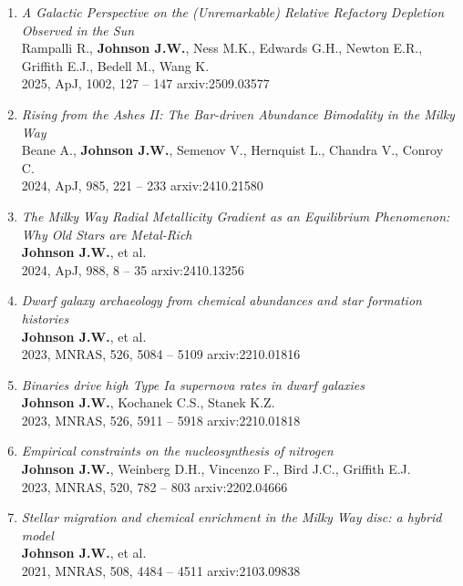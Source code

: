 \documentclass[cv.tex]{subfiles}
\begin{document}
\begin{enumerate}
	\item \textit{A Galactic Perspective on the (Unremarkable) Relative
	Refactory Depletion Observed in the Sun}
	\\
	Rampalli R., \textbf{Johnson J.W.}, Ness M.K., Edwards G.H., Newton E.R.,
	Griffith E.J., Bedell M., Wang K.
	\\
	2025, ApJ, 1002, 127 -- 147 \hfill arxiv:2509.03577

	\item \textit{Rising from the Ashes II: The Bar-driven Abundance Bimodality
	in the Milky Way}
	\\
	Beane A., \textbf{Johnson J.W.}, Semenov V., Hernquist L., Chandra V.,
	Conroy C.
	\\
	2024, ApJ, 985, 221 -- 233 \hfill arxiv:2410.21580

	\item \textit{The Milky Way Radial Metallicity Gradient as an Equilibrium
	Phenomenon: Why Old Stars are Metal-Rich}
	\\
	\textbf{Johnson J.W.}, et al.
	\\
	2024, ApJ, 988, 8 -- 35 \hfill arxiv:2410.13256

	\item \textit{Dwarf galaxy archaeology from chemical abundances and star
	formation histories}
	\\
	\textbf{Johnson J.W.}, et al.
	\\
	2023, MNRAS, 526, 5084 -- 5109 \hfill arxiv:2210.01816

	\item \textit{Binaries drive high Type Ia supernova rates in dwarf
	galaxies}
	\\
	\textbf{Johnson J.W.}, Kochanek C.S., Stanek K.Z.
	\\
	2023, MNRAS, 526, 5911 -- 5918 \hfill arxiv:2210.01818

	\item \textit{Empirical constraints on the nucleosynthesis of nitrogen}
	\\
	\textbf{Johnson J.W.}, Weinberg D.H., Vincenzo F., Bird J.C., Griffith E.J.
	\\
	2023, MNRAS, 520, 782 -- 803 \hfill arxiv:2202.04666

	\item \textit{Stellar migration and chemical enrichment in the Milky Way
	disc: a hybrid model}
	\\
	\textbf{Johnson J.W.}, et al.
	\\
	2021, MNRAS, 508, 4484 -- 4511 \hfill arxiv:2103.09838


\end{enumerate}
\end{document}
